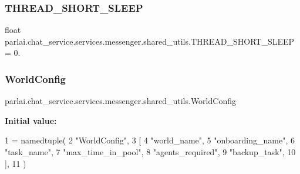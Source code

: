 \subsubsection{\texorpdfstring{T\+H\+R\+E\+A\+D\+\_\+\+S\+H\+O\+R\+T\+\_\+\+S\+L\+E\+EP}{THREAD\_SHORT\_SLEEP}}
{\footnotesize\ttfamily float parlai.\+chat\+\_\+service.\+services.\+messenger.\+shared\+\_\+utils.\+T\+H\+R\+E\+A\+D\+\_\+\+S\+H\+O\+R\+T\+\_\+\+S\+L\+E\+EP = 0.}

\mbox{\label{namespaceparlai_1_1chat__service_1_1services_1_1messenger_1_1shared__utils_a2fad0a70ab62b27b2692978de3a852f1}} 
\subsubsection{\texorpdfstring{World\+Config}{WorldConfig}}
{\footnotesize\ttfamily parlai.\+chat\+\_\+service.\+services.\+messenger.\+shared\+\_\+utils.\+World\+Config}

{\bfseries Initial value\+:}
\begin{DoxyCode}
1 =  namedtuple(
2     \textcolor{stringliteral}{"WorldConfig"},
3     [
4         \textcolor{stringliteral}{"world\_name"},
5         \textcolor{stringliteral}{"onboarding\_name"},
6         \textcolor{stringliteral}{"task\_name"},
7         \textcolor{stringliteral}{"max\_time\_in\_pool"},
8         \textcolor{stringliteral}{"agents\_required"},
9         \textcolor{stringliteral}{"backup\_task"},
10     ],
11 )
\end{DoxyCode}

